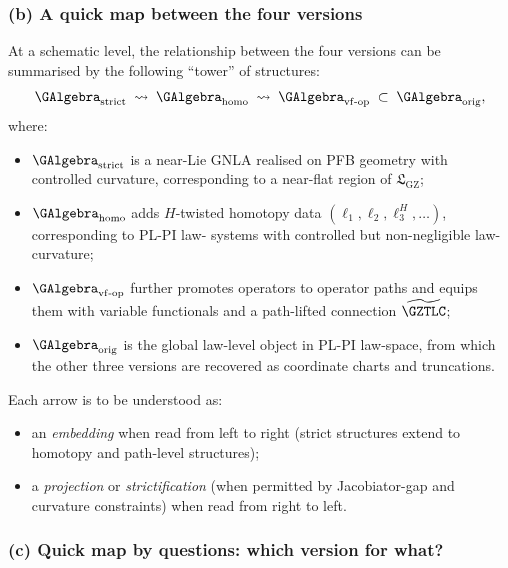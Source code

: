 \documentclass[11pt]{book}
\theoremstyle{plain}
\theoremstyle{definition}
\newcommand{\GZLS}{\ensuremath{\mathfrak{L}_{\mathrm{GZ}}}}       \newcommand{\GZLT}{\ensuremath{M_{!w}}}                           \newcommand{\GZLOC}{\ensuremath{A_M}}                             \newcommand{\GZLCurv}{\ensuremath{\mathcal{F}_{\mathrm{law}}}}
\begin{document}
\subsubsection*{(b) A quick map between the four versions}

At a schematic level, the relationship between the four versions can be
summarised by the following “tower” of structures:
\[
   \GAlgebra_{\mathrm{strict}}
   \;\rightsquigarrow\;
   \GAlgebra_{\mathrm{homo}}
   \;\rightsquigarrow\;
   \GAlgebra_{\mathrm{vf\text- op}}
   \;\subset\;
   \GAlgebra_{\mathrm{orig}},
\]
where:

\begin{itemize}
  \item $\GAlgebra_{\mathrm{strict}}$ is a near-Lie GNLA realised on
        PFB geometry with controlled curvature, corresponding to a
        near-flat region of \GZLS;
  \item $\GAlgebra_{\mathrm{homo}}$ adds $H$-twisted homotopy data
        $(\ell_1,\ell_2,\ell_3^H,\dots)$, corresponding to PL-PI law-
        systems with controlled but non-negligible law-curvature;
  \item $\GAlgebra_{\mathrm{vf\text- op}}$ further promotes operators
        to operator paths and equips them with variable functionals and
        a path-lifted connection $\widetilde{\GZTLC}$;
  \item $\GAlgebra_{\mathrm{orig}}$ is the global law-level object in
        PL-PI law-space, from which the other three versions are
        recovered as coordinate charts and truncations.
\end{itemize}

Each arrow is to be understood as:

\begin{itemize}
  \item an \emph{embedding} when read from left to right (strict
        structures extend to homotopy and path-level structures);
  \item a \emph{projection} or \emph{strictification} (when permitted
        by Jacobiator-gap and curvature constraints) when read from
        right to left.
\end{itemize}



\subsubsection*{(c) Quick map by questions: which version for what?}
\end{document}
